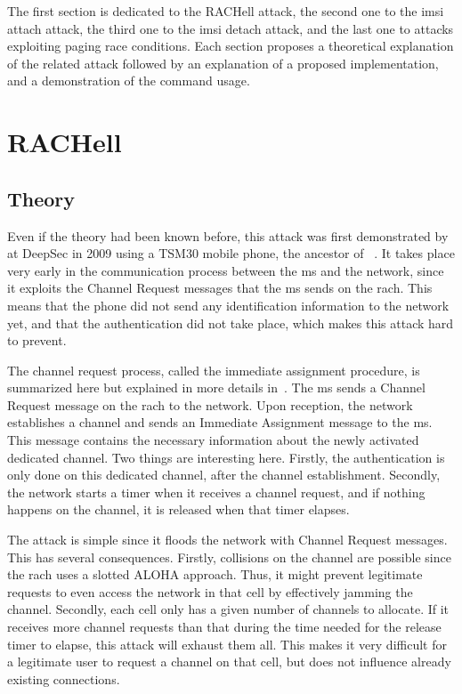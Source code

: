     The first section is dedicated to the RACHell attack, the second one
    to the \gls{imsi} attach attack, the third one to the \gls{imsi}
    detach attack, and the last one to attacks exploiting paging race
    conditions. Each section proposes a theoretical explanation of the
    related attack followed by an explanation of a proposed
    implementation, and a demonstration of the command usage.

    \section{RACHell}

      \subsection{Theory}

      Even if the theory had been known before, this attack was first
      demonstrated by  at DeepSec in 2009 using a
      TSM30 mobile phone, the ancestor of
      ~\cite{spaar_practical_2009}. It takes place very
      early in the communication process between the \gls{ms} and the
      network, since it exploits the Channel Request messages that the
      \gls{ms} sends on the \gls{rach}. This means that the phone did
      not send any identification information to the network yet, and
      that the authentication did not take place, which makes this
      attack hard to prevent.

      The channel request process, called the immediate assignment
      procedure, is summarized here but explained in more details
      in~. The \gls{ms} sends a Channel Request
      message on the \gls{rach} to the network. Upon reception, the
      network establishes a channel and sends an Immediate Assignment
      message to the \gls{ms}. This message contains the necessary
      information about the newly activated dedicated channel. Two
      things are interesting here. Firstly, the authentication is only
      done on this dedicated channel, after the channel establishment.
      Secondly, the network starts a timer when it receives a channel
      request, and if nothing happens on the channel, it is released
      when that timer elapses.

      The attack is simple since it floods the network with Channel
      Request messages. This has several consequences. Firstly,
      collisions on the channel are possible since the \gls{rach} uses a
      slotted ALOHA approach. Thus, it might prevent legitimate requests
      to even access the network in that cell by effectively jamming the
      channel. Secondly, each cell only has a given number of channels
      to allocate. If it receives more channel requests than that during
      the time needed for the release timer to elapse, this attack will
      exhaust them all. This makes it very difficult for a legitimate
      user to request a channel on that cell, but does not influence
      already existing connections.
      
